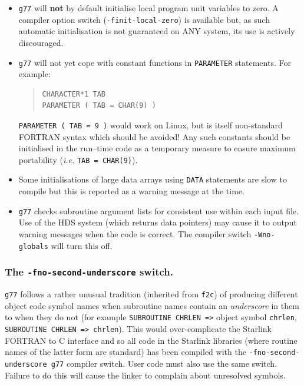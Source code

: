 \documentclass[twoside,11pt]{article}
\renewcommand{\_}{\texttt{\symbol{95}}}
\begin{document}
\begin{itemize}

\item \texttt{g77} will \textbf{not} by default initialise local program
unit variables to zero.  A compiler option switch (\texttt{-finit-local-zero})
is available but, as such automatic initialisation is not guaranteed on ANY 
system, its use is actively discouraged.

\item \texttt{g77} will not yet cope with constant functions in
\texttt{PARAMETER} statements.  For example:

\begin{quote}
\begin{verbatim}
CHARACTER*1 TAB
PARAMETER ( TAB = CHAR(9) )
\end{verbatim}
\end{quote}

\texttt{PARAMETER ( TAB = 9 )} would work on Linux, but is itself
non-standard FORTRAN syntax which should be avoided!  Any such
constants should be initialised in the run--time code as a temporary
measure to ensure maximum portability (\emph{i.e.} \texttt{TAB~=~CHAR(9)}).

\item Some initialisations of large data arrays using \texttt{DATA}
statements are slow to compile but this is reported as a warning
message at the time.

\item \texttt{g77} checks subroutine argument lists for consistent use
within each input file.  Use of the HDS system (which returns data
pointers)  may cause it to output warning messages when the code is
correct.  The compiler switch \texttt{-Wno-globals} will turn this off.

\end{itemize}

\subsubsection{The \texttt{-fno-second-underscore} switch.}

\texttt{g77} follows a rather unusual tradition (inherited from
\texttt{f2c}) of producing different object code symbol names when
subroutine names contain an \textit{underscore} in them to when they do
not (for example \texttt{SUBROUTINE CHRLEN =>} object symbol
\texttt{chrlen\_}, \texttt{SUBROUTINE CHR\_LEN => chr\_len\_\_}).  This
would over-complicate the Starlink FORTRAN to C interface and so all
code in the Starlink libraries (where routine names of the latter form
are standard) has been compiled with the \texttt{-fno-second-underscore
g77} compiler switch.  User code must also use the same switch.
Failure to do this will cause the linker to complain about unresolved
symbols.
\end{document}
